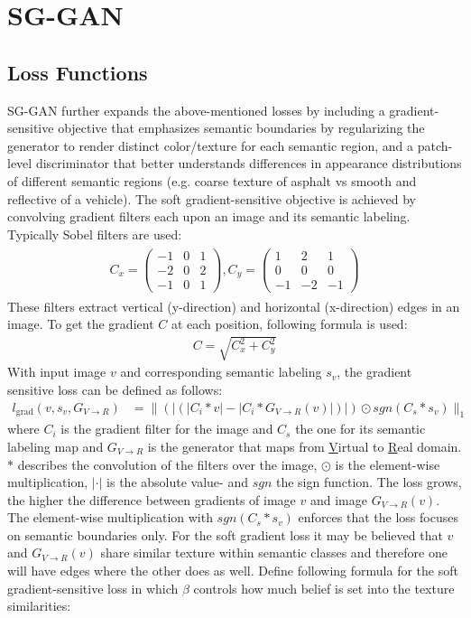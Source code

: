 \section{SG-GAN}

\subsection{Loss Functions}
SG-GAN \cite{DBLP:journals/corr/abs-1801-01726} further expands the above-mentioned losses by including a gradient-sensitive objective that emphasizes semantic boundaries by regularizing the generator to render distinct color/texture for each semantic region, and a patch-level discriminator that better understands differences in appearance distributions of different semantic regions (e.g. coarse texture of asphalt vs smooth and reflective of a vehicle). The soft gradient-sensitive objective is achieved by convolving gradient filters each upon an image and its semantic labeling. Typically Sobel filters are used:
\begin{align}
	\begin{array}{cc}
		C_x = 
		\begin{pmatrix}
			-1 & 0 & 1\\
			-2 & 0 & 2\\
			-1 & 0 & 1
		\end{pmatrix},
		C_y = 
		\begin{pmatrix}
			1 & 2 & 1\\
			0 & 0 & 0\\
			-1 & -2 & -1
		\end{pmatrix}
	\end{array}
	\label{eq:sobel}
\end{align}
These filters extract vertical (y-direction) and horizontal (x-direction) edges in an image. To get the gradient $C$ at each position, following formula is used:
\begin{align}
	C = \sqrt{C_x^2 + C_y^2}
\end{align}
With input image $v$ and corresponding semantic labeling $s_v$, the gradient sensitive loss can be defined as follows:
\begin{align}
		l_{\text{grad}}(v,s_v,G_{V\rightarrow R}) &= \lVert(|(|C_i * v |-|C_i*G_{V\rightarrow R}(v)|)|) \odot sgn(C_s*s_v)\rVert_1
\end{align}
where $C_i$ is the gradient filter for the image and $C_s$ the one for its semantic labeling map and $G_{V\rightarrow R}$ is the generator that maps from \underline{V}irtual to \underline{R}eal domain. $*$ describes the convolution of the filters over the image, $\odot$ is the element-wise multiplication, $|\cdot|$ is the absolute value- and $sgn$ the sign function. The loss grows, the higher the difference between gradients of image $v$ and image $G_{V\rightarrow R}(v)$. The element-wise multiplication with $sgn(C_s * s_v)$ enforces that the loss focuses on semantic boundaries only. For the soft gradient loss it may be believed that $v$ and $G_{V\rightarrow R}(v)$ share similar texture within semantic classes and therefore one will have edges where the other does as well. Define following formula for the soft gradient-sensitive loss in which $\beta$ controls how much belief is set into the texture similarities:
